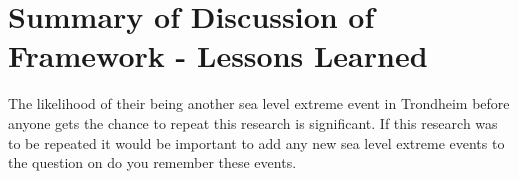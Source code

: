 \section{Summary of Discussion of Framework - Lessons Learned}


The likelihood of their being another sea level extreme event in Trondheim before anyone gets the chance to repeat this research is significant. If this research was to be repeated it would be important to add any new sea level extreme events to the question on do you remember these events. 